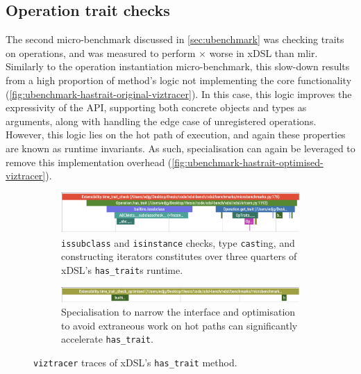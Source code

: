 











\subsection{Operation trait checks}
\label{ssec:specialising-ubenchmarks-trait}

The second micro-benchmark discussed in \autoref{sec:ubenchmark} was checking traits on operations, and was measured to perform $\times$ worse in xDSL than \ac{mlir}.
Similarly to the operation instantiation micro-benchmark, this slow-down results from a high proportion of method's logic not implementing the core functionality (\autoref{fig:ubenchmark-hastrait-original-viztracer}). In this case, this logic improves the expressivity of the API, supporting both concrete objects and types as arguments, along with handling the edge case of unregistered operations. However, this logic lies on the hot path of execution, and again these properties are known as runtime invariants. As such, specialisation can again be leveraged to remove this implementation overhead (\autoref{fig:ubenchmark-hastrait-optimised-viztracer}).

\begin{figure}[H]
    \centering
    \begin{subfigure}[b]{\textwidth}
        \centering
        \includegraphics[width=\textwidth]{images/specialising_optimising_xdsl_rewriting/original_hastrait.png}
        \captionsetup{width=0.8\textwidth}
        \caption{\texttt{issubclass} and \texttt{isinstance} checks, type \texttt{cast}ing, and constructing iterators constitutes over three quarters of xDSL's \texttt{has_trait}s runtime.}
        \label{fig:ubenchmark-hastrait-original-viztracer}
    \end{subfigure}
    \begin{subfigure}[b]{\textwidth}
        \centering
        \includegraphics[width=\textwidth]{images/specialising_optimising_xdsl_rewriting/optimised_hastrait.png}
        \captionsetup{width=0.8\textwidth}
        \caption{Specialisation to narrow the interface and optimisation to avoid extraneous work on hot paths can significantly accelerate \texttt{has_trait}.}
        \label{fig:ubenchmark-hastrait-optimised-viztracer}
    \end{subfigure}
    \caption{\texttt{viztracer} traces of xDSL's \texttt{has_trait} method.}
    \label{fig:ubenchmark-hastrait-viztracer}
\end{figure}


